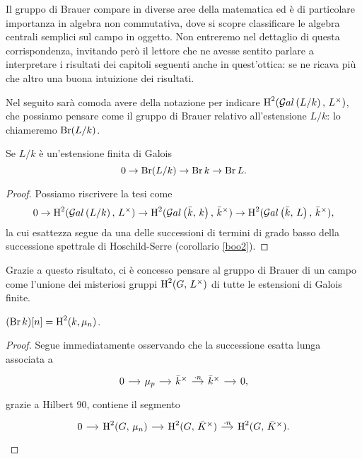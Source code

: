 Il gruppo di Brauer compare in diverse aree della matematica ed è di particolare importanza in algebra non commutativa, dove si scopre classificare le algebra centrali semplici sul campo in oggetto. Non entreremo nel dettaglio di questa corrispondenza, invitando però il lettore che ne avesse sentito parlare a interpretare i risultati dei capitoli seguenti anche in quest'ottica: se ne ricava più che altro una buona intuizione dei risultati.

Nel seguito sarà comoda avere della notazione per indicare $ \operatorname{H}^2(\mathcal{G}al\left( L/k \right), \, L^\times) $, che possiamo pensare come il gruppo di Brauer relativo all'estensione $ L/k $: lo chiameremo $ \operatorname{Br}(L/k) $.

\begin{lemma}\label{stronzetto}
	Se $ L/k $ è un'estensione finita di Galois
	\[ 0 \to \operatorname{Br}(L/k) \to \operatorname{Br} k \to \operatorname{Br} L.  \]
\end{lemma}
\begin{proof}
	Possiamo riscrivere la tesi come
	\[ 0 \to \operatorname{H}^2(\mathcal{G}al\left( L/k \right), \, L^\times) \to \operatorname{H}^2(\mathcal{G}al\left( \bar{k}, \, k \right), \, \bar{k}^\times) \to \operatorname{H}^2(\mathcal{G}al\left( \bar{k}, \, L \right), \, \bar{k}^\times), \]
	la cui esattezza segue da una delle successioni di termini di grado basso della successione spettrale di Hoschild-Serre (corollario \ref{boo2}).
\end{proof}

Grazie a questo risultato, ci è concesso pensare al gruppo di Brauer di un campo come l'unione dei misteriosi gruppi $ \operatorname{H}^2(G, \, L^\times) $ di tutte le estensioni di Galois finite.


\begin{lemma} \label{torsione del brauer}
	$ (\operatorname{Br} k) [n] = \operatorname{H}^2(k, \mu_n) $.
\end{lemma}
\begin{proof}
	Segue immediatamente osservando che la successione esatta lunga associata a 
	\[\begin{tikzcd}[column sep = small]
	0 \rar
	& \mu_p \rar
	& \bar{k}^\times \rar["\cdot n"]
	& \bar{k}^\times \rar
	& 0,
	\end{tikzcd}  \]
	grazie a Hilbert 90, contiene il segmento
	\[\begin{tikzcd}[column sep = small]
	0 \rar
	& \HH^2(G, \, \mu_n) \rar
	& \HH^2(G, \, \bar{\K}^\times) \rar["\cdot n"]
	& \HH^2(G, \, \bar{\K}^\times).
	\end{tikzcd}  \]
\end{proof}

